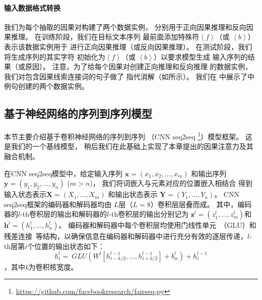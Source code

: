 \paragraph*{输入数据格式转换}
我们为每个抽取的因果对构建了两个数据实例，
分别用于正向因果推理和反向因果推理。
在训练阶段，我们在目标文本序列
最前面添加特殊符$\left< f\right>$（或
$\left< b \right>$）表示该数据实例用于
进行正向因果推理（或反向因果推理）。
在测试阶段，我们将生成序列的其实字符
初始化为$\left< f\right>$（或
$\left< b \right>$）以要求模型生成
输入序列的结果（或原因）。
注意，为了给每个因果对创建正向推理和反向推理
的数据实例，我们对包含因果线索连接词的句子做了
指代消解（如所示）。
我们在
中展示了中
例句创建的两个数据实例。

\begin{figure*}[th!]
	\centering
	\quad
	\label{fig:causalgen-example}
\end{figure*}

\subsection{基于神经网络的序列到序列模型}
\label{sec:causalgen-cnn}
本节主要介绍基于卷积神经网络的序列到序列
（CNN seq2seq
\footnote{\url{https://github.com/facebookresearch/fairseq-py}}）模型框架。
这是我们的一个基线模型，
稍后我们在此基础上实现了本章提出的因果注意力及其融合机制。

在CNN seq2seq模型中，给定输入序列
$\textbf{x} = (x_{1},x_{2},...,x_{m})$ 和输出序列 
$\textbf{y} = (y_{1}, y_{2},..., y_{n})$ ($m>n$)，
我们将词嵌入与元素对应的位置嵌入相结合
得到输入状态表示$\mathbf{X} = (X_1,...,X_m)$ 
和输出状态表示 $\mathbf{Y}=(Y_1,...,Y_n)$。
CNN seq2seq框架的编码器和解码器均由
$L$层（$L=8$）卷积层层叠而成。
其中，编码器的$l$-th卷积层的输出和解码器的$l$-th卷积层的输出分别记为
$\mathbf { z } ^ { l } = \left( z _ { 1 } ^ { l } , \ldots , z _ { m } ^ { l } \right)$和$\mathbf { h } ^ { l } = \left( h _ { 1 } ^ { l } , \ldots , h _ { n } ^ { l } \right)$。
编码器和解码器中每个卷积层均使用门线性单元~\cite{DauphinFAG17}（GLU）和残差连接~\cite{HeZRS16}等结构，以确保信息在编码器和解码器中进行充分有效的逐层传递，$l$-th层第$i$个位置的输出状态如下：
\begin{equation}
h _ { i } ^ { l } = ~ GLU \left( W ^ { l } \left[ h _ {i-k/2 } ^ { l - 1 } , \ldots , h _ { i+k/2 } ^ { l - 1 } \right] + b _ { w } ^ { l } \right)  + h _ { i } ^ { l - 1 }
\end{equation} 
，其中\textit{k}为卷积核宽度。

